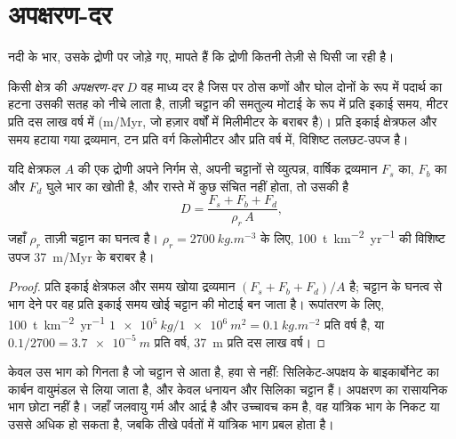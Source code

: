 \section{अपक्षरण-दर}\label{sec:b1:erosion-transport:denudation}

नदी के भार, उसके द्रोणी पर जोड़े गए, मापते हैं कि द्रोणी कितनी तेज़ी से घिसी जा रही है।

\begin{definition}\label{def:b1:erosion-transport:denudation}
किसी क्षेत्र की \emph{अपक्षरण-दर} $D$ वह माध्य दर है जिस पर ठोस कणों और घोल दोनों के रूप में पदार्थ का हटना उसकी सतह को नीचे लाता है, ताज़ी चट्टान की समतुल्य मोटाई के रूप में प्रति इकाई समय, मीटर प्रति दस लाख वर्ष में (\unit{m/Myr}, जो हज़ार वर्षों में मिलीमीटर के बराबर है)। प्रति इकाई क्षेत्रफल और समय हटाया गया द्रव्यमान, टन प्रति वर्ग किलोमीटर और प्रति वर्ष में, विशिष्ट तलछट-उपज है।
\end{definition}

\begin{proposition}
\label{prop:b1:erosion-transport:denudation}
यदि क्षेत्रफल $A$ की एक द्रोणी अपने निर्गम से, अपनी चट्टानों से व्युत्पन्न, वार्षिक द्रव्यमान $F_s$  का, $F_b$  का और $F_d$ घुले भार का खोती है, और रास्ते में कुछ संचित नहीं होता, तो उसकी  है
\[
  D = \frac{F_s + F_b + F_d}{\rho_r\,A},
\]
जहाँ $\rho_r$ ताज़ी चट्टान का घनत्व है। $\rho_r =
\qty{2700}{kg.m^{-3}}$ के लिए, \qty{100}{t.km^{-2}.yr^{-1}} की विशिष्ट उपज \qty{37}{m/Myr} के बराबर है।
\end{proposition}

\begin{proof}
प्रति इकाई क्षेत्रफल और समय खोया द्रव्यमान $(F_s + F_b + F_d)/A$ है; चट्टान के घनत्व से भाग देने पर वह प्रति इकाई समय खोई चट्टान की मोटाई बन जाता है। रूपांतरण के लिए, \qty{100}{t.km^{-2}.yr^{-1}} $\qty{1e5}{kg}/\qty{1e6}{m^2} = \qty{0.1}{kg.m^{-2}}$ प्रति वर्ष है, या
$0.1/2700 = \qty{3.7e-5}{m}$ प्रति वर्ष, \qty{37}{m} प्रति दस लाख वर्ष।
\end{proof}

 केवल उस भाग को गिनता है जो चट्टान से आता है, हवा से नहीं: सिलिकेट-अपक्षय के बाइकार्बोनेट का कार्बन वायुमंडल से लिया जाता है, और केवल धनायन और सिलिका चट्टान हैं। अपक्षरण का रासायनिक भाग छोटा नहीं है। जहाँ जलवायु गर्म और आर्द्र है और उच्चावच कम है, वह यांत्रिक भाग के निकट या उससे अधिक हो सकता है, जबकि तीखे पर्वतों में यांत्रिक भाग प्रबल होता है।

